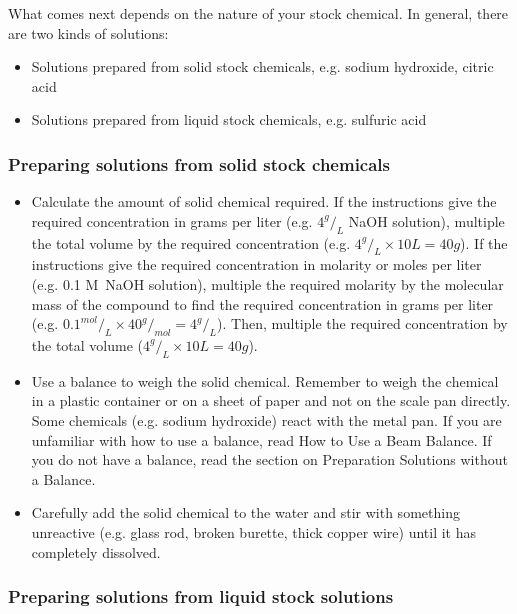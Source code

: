 What comes next depends on the nature of your stock chemical. In general, there are two kinds of solutions:
\begin{itemize}
\item{Solutions prepared from solid stock chemicals, e.g. sodium hydroxide, citric acid}
\item{Solutions prepared from liquid stock chemicals, e.g. sulfuric acid}
\end{itemize}

\subsubsection{Preparing solutions from solid stock chemicals}

\begin{itemize}

\item{Calculate the amount of solid chemical required. If the instructions give the required concentration in grams per liter (e.g. $ 4 ^g/_L $ NaOH solution), multiple the total volume by the required concentration (e.g. $ 4 ^g/_L \times 10 L = 40 g $). If the instructions give the required concentration in molarity or moles per liter (e.g. 0.1 M~NaOH solution), multiple the required molarity by the molecular mass of the compound to find the required concentration in grams per liter (e.g. $ 0.1 ^{mol}/_L \times 40 ^g/_{mol} = 4 ^g/_L $). Then, multiple the required concentration by the total volume ($ 4 ^g/_L \times 10 L = 40g $).}

\item{Use a balance to weigh the solid chemical. Remember to weigh the chemical in a plastic container or on a sheet of paper and not on the scale pan directly. Some chemicals (e.g. sodium hydroxide) react with the metal pan. If you are unfamiliar with how to use a balance, read How to Use a Beam Balance. If you do not have a balance, read the section on Preparation Solutions without a Balance.}

\item{Carefully add the solid chemical to the water and stir with something unreactive (e.g. glass rod, broken burette, thick copper wire) until it has completely dissolved.}

\end{itemize}

\subsubsection{Preparing solutions from liquid stock solutions}

